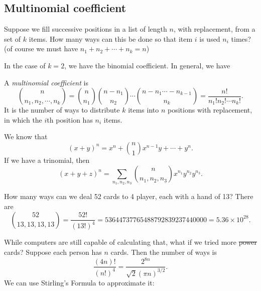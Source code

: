 \documentclass[a4paper]{article}
\begin{document}
\subsection{Multinomial coefficient}
Suppose we fill successive positions in a list of length $n$, with replacement, from a set of $k$ items. How many ways can this be done so that item $i$ is used $n_i$ times? (of course we must have $n_1 + n_2 + \cdots + n_k = n$)

In the case of $k = 2$, we have the binomial coefficient. In general, we have
\begin{defi}
  A \emph{multinomial coefficient} is
  \[
    \binom{n}{n_1, n_2, \cdots, n_k} = \binom{n}{n_1}\binom{n - n_1}{n_2}\cdots \binom{n - n_1\cdots - n_{k - 1}}{n_k} = \frac{n!}{n_1!n_2!\cdots n_k!}.
  \]
  It is the number of ways to distribute $k$ items into $n$ positions with replacement, in which the $i$th position has $n_i$ items.
\end{defi}

\begin{eg}
  We know that
  \[
    (x + y)^n = x^n + \binom{n}{1}x^{n - 1}y + \cdots + y^n.
  \]
  If we have a trinomial, then
  \[
    (x + y + z)^n = \sum_{n_1, n_2, n_3} \binom{n}{n_1, n_2, n_3} x^{n_1}y^{n_2}y^{n_3}.
  \]
\end{eg}

\begin{eg}
  How many ways can we deal 52 cards to 4 player, each with a hand of 13? There are
  \[
    \binom{52}{13, 13, 13, 13} = \frac{52!}{(13!)^4} = 53644737765488792839237440000 = 5.36\times 10^{28}.
  \]
\end{eg}


While computers are still capable of calculating that, what if we tried more \st{power} cards? Suppose each person has $n$ cards. Then the number of ways is
\[
  \frac{(4n)!}{(n!)^4} = \frac{2^{8n}}{\sqrt{2} (\pi n)^{3/2}}.
\]
We can use Stirling's Formula to approximate it:
\end{document}
